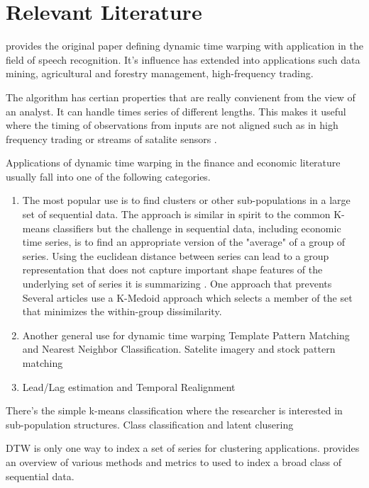 \documentclass[12pt]{article}
\begin{document}
\section{Relevant Literature}

\cite{SakoeChiba_IEEE_1978} provides the original paper defining dynamic time warping with application in the field of speech recognition. It's influence has extended into applications such data mining, agricultural and forestry management, high-frequency trading.

The algorithm has certian properties that are really convienent from the view of an analyst. It can handle times series of different lengths. This makes it useful where the timing of observations from inputs are not aligned such as in high frequency trading or streams of satalite sensors \parencite{Maus_et_al_2016}.

Applications of dynamic time warping in the finance and economic literature usually fall into one of the following categories.

\begin{enumerate}
    \item The most popular use is to find clusters or other sub-populations in a large set of sequential data. The approach is similar in spirit to the common K-means classifiers but the challenge in sequential data, including economic time series, is to find an appropriate version of the "average" of a group of series. Using the euclidean distance between series can lead to a group representation that does not capture important shape features of the underlying set of series it is summarizing \parencite{PETITJEAN2011678}. One approach that prevents Several articles use a K-Medoid approach which selects a member of the set that minimizes the within-group dissimilarity.
    \item Another general use for dynamic time warping Template Pattern Matching and Nearest Neighbor Classiﬁcation. Satelite imagery and stock pattern matching
    \item Lead/Lag estimation and Temporal Realignment
\end{enumerate}
There's the simple k-means classification where the researcher is interested in sub-population structures.  Class classification and latent clusering 

DTW is only one way to index a set of series for clustering applications. \cite{ElsingAgon2012} provides an overview of various methods and metrics to used to index a broad class of sequential data.
\end{document}
